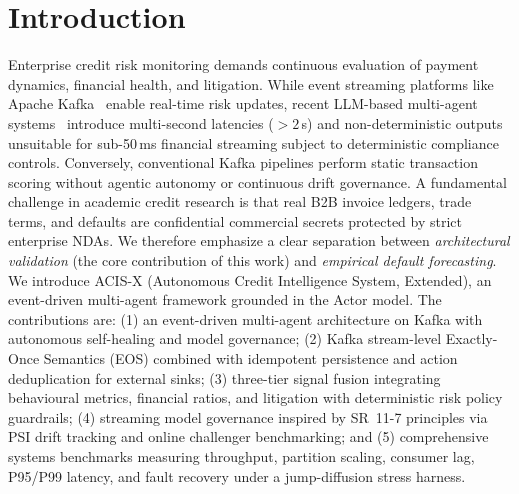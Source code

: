 \documentclass[runningheads]{llncs}
\begin{document}

\section{Introduction}
\label{sec:intro}
Enterprise credit risk monitoring demands continuous evaluation of payment dynamics, financial health, and litigation. While event streaming platforms like Apache Kafka~\cite{kreps2011kafka} enable real-time risk updates, recent LLM-based multi-agent systems~\cite{jajoo2025masca} introduce multi-second latencies ($>2$\,s) and non-deterministic outputs unsuitable for sub-50\,ms financial streaming subject to deterministic compliance controls. Conversely, conventional Kafka pipelines perform static transaction scoring without agentic autonomy or continuous drift governance.
A fundamental challenge in academic credit research is that real B2B invoice ledgers, trade terms, and defaults are confidential commercial secrets protected by strict enterprise NDAs. We therefore emphasize a clear separation between \textit{architectural validation} (the core contribution of this work) and \textit{empirical default forecasting}. We introduce ACIS-X (Autonomous Credit Intelligence System, Extended), an event-driven multi-agent framework grounded in the Actor model. The contributions are: (1) an event-driven multi-agent architecture on Kafka with autonomous self-healing and model governance; (2) Kafka stream-level Exactly-Once Semantics (EOS) combined with idempotent persistence and action deduplication for external sinks; (3) three-tier signal fusion integrating behavioural metrics, financial ratios, and litigation with deterministic risk policy guardrails; (4) streaming model governance inspired by SR~11-7 principles via PSI drift tracking and online challenger benchmarking; and (5) comprehensive systems benchmarks measuring throughput, partition scaling, consumer lag, P95/P99 latency, and fault recovery under a jump-diffusion stress harness. 
\end{document}
